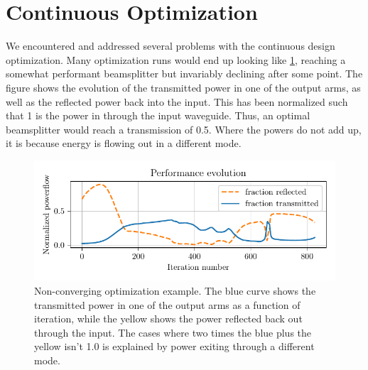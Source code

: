\section{Continuous Optimization}\label{sec:res_cont}

We encountered and addressed several problems with the continuous design
optimization.
Many optimization runs would end up looking like \cref{fig:bad_cont_conv},
reaching a somewhat performant beamsplitter but invariably declining after some
point.
The figure shows the evolution of the transmitted power in one of the
output arms, as well as the reflected power back into the input.
This has been normalized such that 1 is the power in through the input waveguide.
Thus, an optimal beamsplitter would reach a transmission of 0.5.
Where the powers do not add up, it is because energy is flowing out in a different
mode.

\begin{figure}[htpb]
	\centering
	\includegraphics{chapters/results/conv_22.pdf}
	\caption{%
		Non-converging optimization example. The blue curve shows the
		transmitted power in one of the output arms as a function of iteration,
		while the yellow shows the power reflected back out through the input.
		The cases where two times the blue plus the yellow isn't 1.0 is
		explained by power exiting through a different mode.
	}%
	\label{fig:bad_cont_conv}
\end{figure}

